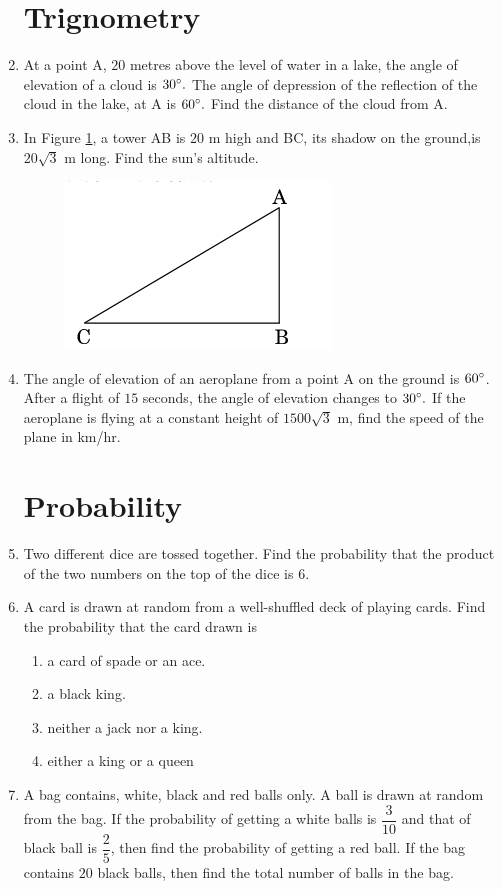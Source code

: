 \documentclass[10pt,-letter paper]{article}
\begin{document}
\begin{enumerate}
\section{Trignometry}
\item At a point A, $20$ metres above the level of water in a lake, the angle of elevation of a cloud is $30 \degree.$ The angle of depression of the reflection of the cloud in the lake, at A is $60\degree .$ Find the distance of the cloud from A.
\item In Figure \ref{Figure 1}, a tower AB is $20$ m high and BC, its shadow on the ground,is $20\sqrt{3}$ m long. Find the sun's altitude.
\begin{figure}[h!]
	\centering
    \includegraphics[width=0.5\columnwidth]{./figs/image1.png}
	\caption{}
	\label{Figure 1}
\end{figure}
\item The angle of elevation of an aeroplane from a point A on the ground is $60 \degree  $. After a flight of $15$ seconds, the angle of elevation changes to $  30 \degree.$ If the aeroplane is flying at a constant height of $1500\sqrt{3}$ m, find the speed of the plane in km/hr.

\section{Probability}
\item Two different dice are tossed together. Find the probability that the product of the two numbers on the top of the dice is $6$.
\item A card is drawn at random from a well-shuffled deck of playing cards. Find the probability that the card drawn is
 \begin{enumerate}
     \item a card of spade or an ace.
     \item a black king. 
     \item neither a jack nor a king.
     \item either a king or a queen
 \end{enumerate}
\item A bag contains, white, black and red balls only. A ball is drawn at random from the bag. If the probability of getting a white balls is $\dfrac{3}{10}$ and that of black ball is $\dfrac{2}{5}$, then find the probability of getting a red ball. If the bag contains $20$ black balls, then find the total number of balls in the bag.
\end{enumerate}
\end{document}
